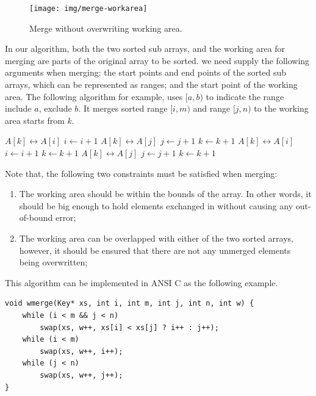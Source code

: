 \documentclass[b5paper]{article}
\begin{document}
\begin{figure}[htbp]
 \centering
 \texttt{[image: img/merge-workarea]}
 \caption{Merge without overwriting working area.}
 \label{fig:merge-workarea}
\end{figure}

In our algorithm, both the two sorted sub arrays, and the working area for merging are parts of the
original array to be sorted. we need supply the following arguments when merging: the start points and end
points of the sorted sub arrays, which can be represented as ranges; and the start point of the working
area. The following algorithm for example, uses $[a, b)$ to indicate the range include $a$,
exclude $b$. It merges sorted range $[i, m)$ and range $[j, n)$ to the working area starts from $k$.

\begin{algorithmic}[1]
\Procedure{Merge}{$A, [i, m), [j, n), k$}
      \State {} $A[k] \leftrightarrow A[i]$
      \State $i \gets i + 1$
    \Else
      \State {} $A[k] \leftrightarrow A[j]$
      \State $j \gets j + 1$
    \EndIf
    \State $k \gets k + 1$
  \EndWhile
    \State {} $A[k] \leftrightarrow A[i]$
    \State $i \gets i + 1$
    \State $k \gets k + 1$
  \EndWhile
    \State {} $A[k] \leftrightarrow A[j]$
    \State $j \gets j + 1$
    \State $k \gets k + 1$
  \EndWhile
\EndProcedure
\end{algorithmic}

Note that, the following two constraints must be satisfied when merging:

\begin{enumerate}
\item The working area should be within the bounds of the array. In other words, it should be big
enough to hold elements exchanged in without causing any out-of-bound error;
\item The working area can be overlapped with either of the two sorted arrays, however, it should
be ensured that there are not any unmerged elements being overwritten;
\end{enumerate}

This algorithm can be implemented in ANSI C as the following example.

\lstset{language=C}
\begin{lstlisting}
void wmerge(Key* xs, int i, int m, int j, int n, int w) {
    while (i < m && j < n)
        swap(xs, w++, xs[i] < xs[j] ? i++ : j++);
    while (i < m)
        swap(xs, w++, i++);
    while (j < n)
        swap(xs, w++, j++);
}
\end{lstlisting}
\end{document}
